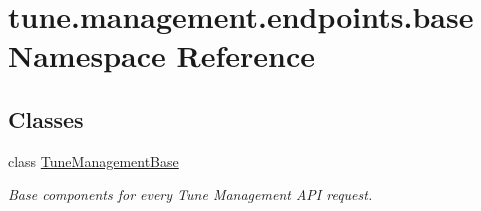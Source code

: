 \hypertarget{namespacetune_1_1management_1_1endpoints_1_1base}{\section{tune.\-management.\-endpoints.\-base Namespace Reference}
\label{namespacetune_1_1management_1_1endpoints_1_1base}
}
\subsection*{Classes}
\begin{DoxyCompactItemize}
\item 
class \hyperlink{classtune_1_1management_1_1endpoints_1_1base_1_1TuneManagementBase}{Tune\-Management\-Base}
\begin{DoxyCompactList}\small\item\em Base components for every Tune Management A\-P\-I request. \end{DoxyCompactList}\end{DoxyCompactItemize}
